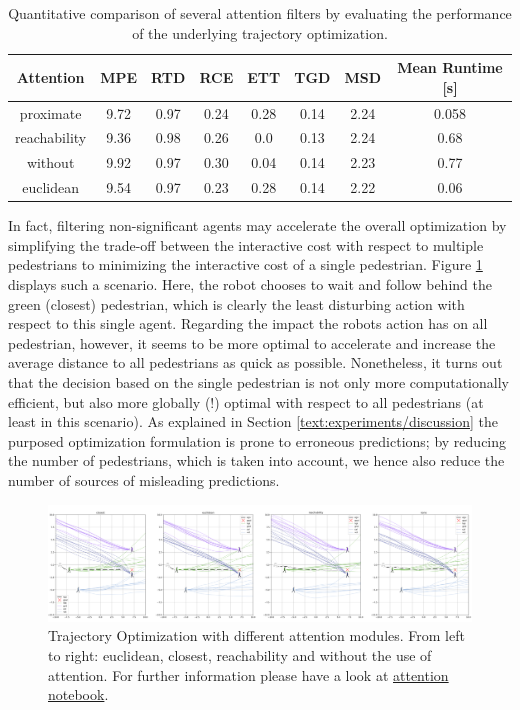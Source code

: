 \begin{table}[!ht]
\begin{center}
\begin{tabular}{c|c|c|c|c|c|c|c}
\bf Attention & \bf MPE & \bf RTD & \bf RCE & \bf ETT & \bf TGD & \bf MSD & \bf Mean Runtime [s] \\
\hline
proximate & 9.72 & 0.97 & 0.24 & 0.28 & 0.14 & 2.24 & 0.058 \\
\hline
reachability & 9.36 & 0.98 & 0.26 & 0.0 & 0.13 & 2.24 & 0.68 \\
\hline
\rowcolor{baseline_color}
without & 9.92 & 0.97 & 0.30 & 0.04 & 0.14 & 2.23 & 0.77 \\ 
\hline
\rowcolor{our_color}
euclidean & 9.54 & 0.97 & 0.23 & 0.28 & 0.14 & 2.22 & 0.06
\end{tabular}
\end{center}
\caption{Quantitative comparison of several attention filters by evaluating the performance of the underlying trajectory optimization.}
\label{table:attention}
\end{table}

In fact, filtering non-significant agents may accelerate the overall optimization by simplifying the trade-off between the interactive cost with respect to multiple pedestrians to minimizing the interactive cost of a single pedestrian. Figure \ref{img:attention} displays such a scenario. Here, the robot chooses to wait and follow behind the green (closest) pedestrian, which is clearly the least disturbing action with respect to this single agent. Regarding the impact the robots action has on all pedestrian, however, it seems to be more optimal to accelerate and increase the average distance to all pedestrians as quick as possible. Nonetheless, it turns out that the decision based on the single pedestrian is not only more computationally efficient, but also more globally (!) optimal with respect to all pedestrians (at least in this scenario). As explained in Section \ref{text:experiments/discussion} the purposed optimization formulation is prone to erroneous predictions; by reducing the number of pedestrians, which is taken into account, we hence also reduce the number of sources of misleading predictions.

\begin{figure}[!ht]
\begin{center}
\includegraphics[width=\textwidth]{images/attention.png}
\end{center}
\caption{Trajectory Optimization with different attention modules. From left to right: euclidean, closest, reachability and without the use of attention. For further information please have a look at \href{https://github.com/simon-schaefer/mantrap/blob/master/examples/attention.ipynb}{attention notebook}.}
\label{img:attention}
\end{figure}
